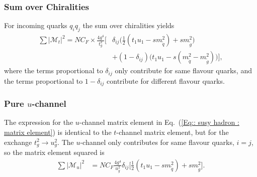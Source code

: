 \documentclass[twoside,english]{uiofysmaster}
\begin{document}
{\subsubsection{Sum over Chiralities}

For incoming quarks $q_iq_j$ the sum over chiralities  yields
\begin{align*}
\sum |\mathcal{M}_t|^2 =  NC_F  \times\frac{4 g^4}{t_g^2} \Big[&\delta_{ij} \big(\frac{1}{2}(t_1u_1 -sm_{\widetilde{q}}^2)+  sm_{\widetilde{g}}^2 \big)\\& + (1-\delta_{ij})\big(t_1u_1 -s(m_{\widetilde{q}}^2- m_{\widetilde{g}}^2) \big)\Big],
\end{align*}
where the terms proportional to $\delta_{ij}$ only contribute for same flavour quarks, and the terms proportional to $1 - \delta_{ij}$ contribute for different flavour quarks.

\subsubsection{Pure $u$-channel}

The expression for the $u$-channel matrix element in Eq.~(\ref{Eq:: susy hadron : matrix element}) is identical to the $t$-channel matrix element, but for the exchange $t_g^2 \rightarrow u_g^2$. The $u$-channel only contributes for same flavour quarks, $i =j$, so the matrix element squared is
\begin{align*}
\sum |\mathcal{M}_u|^2 &=  NC_F \frac{4g^4}{u_g^2} \delta_{ij} \Big[  \frac{1}{2}(t_1u_1-sm_{\widetilde{q}}^2) + sm_{\widetilde{g}}^2 \Big]. 
\end{align*}


}
\end{document}
